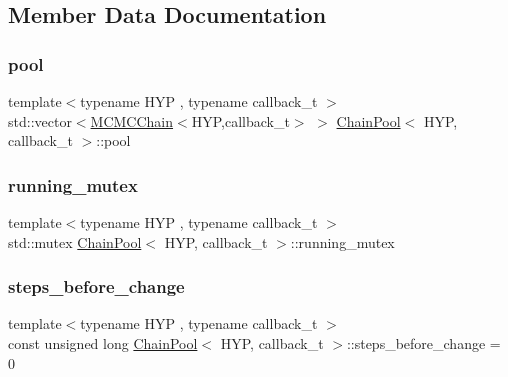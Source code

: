 \subsection{Member Data Documentation}
\mbox{\label{class_chain_pool_af89400f6e9a2312fe2ee7873745a6e91}} 
\subsubsection{\texorpdfstring{pool}{pool}}
{\footnotesize\ttfamily template$<$typename H\+YP , typename callback\+\_\+t $>$ \\
std\+::vector$<$\hyperlink{class_m_c_m_c_chain}{M\+C\+M\+C\+Chain}$<$H\+YP,callback\+\_\+t$>$ $>$ \hyperlink{class_chain_pool}{Chain\+Pool}$<$ H\+YP, callback\+\_\+t $>$\+::pool}

\mbox{\label{class_chain_pool_a6efe006156a22132b452d50dab9f76c0}} 
\subsubsection{\texorpdfstring{running\+\_\+mutex}{running\_mutex}}
{\footnotesize\ttfamily template$<$typename H\+YP , typename callback\+\_\+t $>$ \\
std\+::mutex \hyperlink{class_chain_pool}{Chain\+Pool}$<$ H\+YP, callback\+\_\+t $>$\+::running\+\_\+mutex}

\mbox{\label{class_chain_pool_a143f3e4f9b60c03c67ffbc2db3e57d53}} 
\subsubsection{\texorpdfstring{steps\+\_\+before\+\_\+change}{steps\_before\_change}}
{\footnotesize\ttfamily template$<$typename H\+YP , typename callback\+\_\+t $>$ \\
const unsigned long \hyperlink{class_chain_pool}{Chain\+Pool}$<$ H\+YP, callback\+\_\+t $>$\+::steps\+\_\+before\+\_\+change = 0\hspace{0.3cm}{\ttfamily [static]}}

